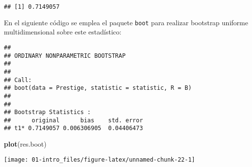 \documentclass[
]{book}
\newenvironment{Shaded}{\begin{snugshade}}{\end{snugshade}}
\newcommand{\CommentTok}[1]{\textcolor[rgb]{0.56,0.35,0.01}{\textit{#1}}}
\newcommand{\ControlFlowTok}[1]{\textcolor[rgb]{0.13,0.29,0.53}{\textbf{#1}}}
\newcommand{\DataTypeTok}[1]{\textcolor[rgb]{0.13,0.29,0.53}{#1}}
\newcommand{\DecValTok}[1]{\textcolor[rgb]{0.00,0.00,0.81}{#1}}
\newcommand{\KeywordTok}[1]{\textcolor[rgb]{0.13,0.29,0.53}{\textbf{#1}}}
\newcommand{\NormalTok}[1]{#1}
\newcommand{\OperatorTok}[1]{\textcolor[rgb]{0.81,0.36,0.00}{\textbf{#1}}}
\newcommand{\StringTok}[1]{\textcolor[rgb]{0.31,0.60,0.02}{#1}}
\theoremstyle{break}
\theoremstyle{definition}
\theoremstyle{definition}
\theoremstyle{definition}
\theoremstyle{remark}
\begin{document}
\begin{Shaded}
\end{Shaded}

\begin{verbatim}
## [1] 0.7149057
\end{verbatim}

En el siguiente código se emplea el paquete \texttt{boot} para realizar bootstrap uniforme multidimensional sobre este estadístico:

\begin{Shaded}
\end{Shaded}

\begin{verbatim}
## 
## ORDINARY NONPARAMETRIC BOOTSTRAP
## 
## 
## Call:
## boot(data = Prestige, statistic = statistic, R = B)
## 
## 
## Bootstrap Statistics :
##      original      bias    std. error
## t1* 0.7149057 0.006306905  0.04406473
\end{verbatim}

\begin{Shaded}
\begin{Highlighting}[]
\KeywordTok{plot}\NormalTok{(res.boot)}
\end{Highlighting}
\end{Shaded}

\begin{center}\texttt{[image: 01-intro\_files/figure-latex/unnamed-chunk-22-1]} \end{center}
\end{document}
